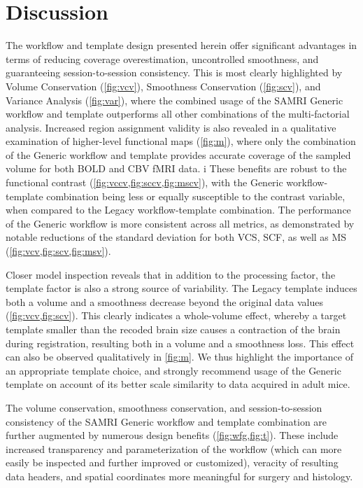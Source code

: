 \section{Discussion}

The workflow and template design presented herein offer significant advantages in terms of reducing coverage overestimation, uncontrolled smoothness, and guaranteeing session-to-session consistency.
This is most clearly highlighted by Volume Conservation (\cref{fig:vcv}), Smoothness Conservation (\cref{fig:scv}), and Variance Analysis (\cref{fig:var}), where the combined usage of the SAMRI Generic workflow and template outperforms all other combinations of the multi-factorial analysis.
Increased region assignment validity is also revealed in a qualitative examination of higher-level functional maps (\cref{fig:m}), where only the combination of the Generic workflow and template provides accurate coverage of the sampled volume for both BOLD and CBV fMRI data.
i%
These benefits are robust to the functional contrast (\cref{fig:vccv,fig:sccv,fig:mscv}), with the Generic workflow-template combination being less or equally susceptible to the contrast variable, when compared to the Legacy workflow-template combination.
The performance of the Generic workflow is more consistent across all metrics, as demonstrated by notable reductions of the standard deviation for both VCS, SCF, as well as MS (\cref{fig:vcv,fig:scv,fig:msv}).

Closer model inspection reveals that in addition to the processing factor, the template factor is also a strong source of variability.
The Legacy template induces both a volume and a smoothness decrease beyond the original data values (\cref{fig:vcv,fig:scv}).
This clearly indicates a whole-volume effect, whereby a target template smaller than the recoded brain size causes a contraction of the brain during registration, resulting both in a volume and a smoothness loss.
This effect can also be observed qualitatively in \cref{fig:m}.
We thus highlight the importance of an appropriate template choice, and strongly recommend usage of the Generic template on account of its better scale similarity to data acquired in adult mice.

The volume conservation, smoothness conservation, and session-to-session consistency of the SAMRI Generic workflow and template combination are further augmented by numerous design benefits (\cref{fig:wfg,fig:t}).
These include increased transparency and parameterization of the workflow (which can more easily be inspected and further improved or customized), veracity of resulting data headers, and spatial coordinates more meaningful for surgery and histology.

